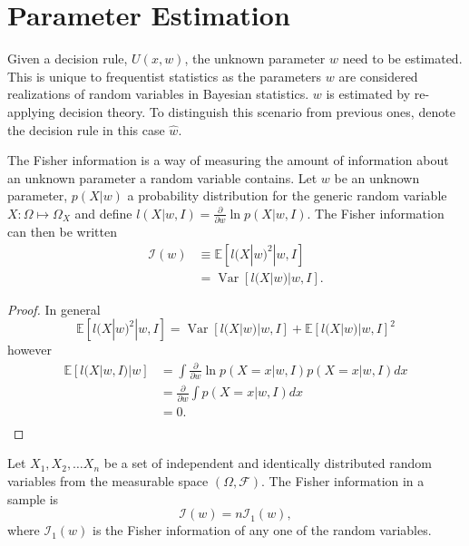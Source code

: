 \chapter{Parameter Estimation}
Given a decision rule, $U(x,w)$, the unknown parameter $w$ need to be estimated. This is unique to frequentist statistics as the parameters $w$ are considered realizations of random variables in Bayesian statistics. $w$ is estimated by re-applying decision theory. To distinguish this scenario from previous ones, denote the decision rule in this case $\hat{w}$.


\begin{definition}
	\label{def:fisher_information}
	The Fisher information is a way of measuring the amount of information about an unknown parameter a random variable contains. Let $w$ be an unknown parameter, $p(X|w)$ a probability distribution for the generic random variable $X:\Omega\mapsto \Omega_X$ and define $l(X|w,I)= \frac{\partial}{\partial w} \ln p(X|w,I)$. The Fisher information can then be written
	\begin{equation}
		\begin{split}
			\mathcal{I}(w) &\equiv \mathbb{E} [l(X|w)^2|w,I]\\
			&= \operatorname{Var}[l(X|w)|w,I].
		\end{split}
	\end{equation}
\end{definition}

\begin{proof}
	In general 
	\begin{equation}
		\mathbb{E} [l(X|w)^2|w,I] = \operatorname{Var}[l(X|w)|w,I]+\mathbb{E}[l(X|w)|w,I]^2
	\end{equation}
	however
	\begin{equation}
		\begin{split}
			\mathbb{E}[l(X|w,I)|w] &= \int  \frac{\partial}{\partial w} \ln p(X=x|w,I) p(X=x|w,I) dx\\
			&= \frac{\partial}{\partial w}\int  p(X=x|w,I) dx\\
			&= 0.\\
		\end{split}
	\end{equation}
\end{proof}


\begin{theorem}
	Let $X_1,X_2,\dots X_n$ be a set of independent and identically distributed random variables from the measurable space $(\Omega,\mathcal{F})$. The Fisher information in a sample is 
	\begin{equation}
		\mathcal{I}(w) = n\mathcal{I}_1(w),
	\end{equation}
	where $\mathcal{I}_1(w)$ is the Fisher information of any one of the random variables.
\end{theorem}


